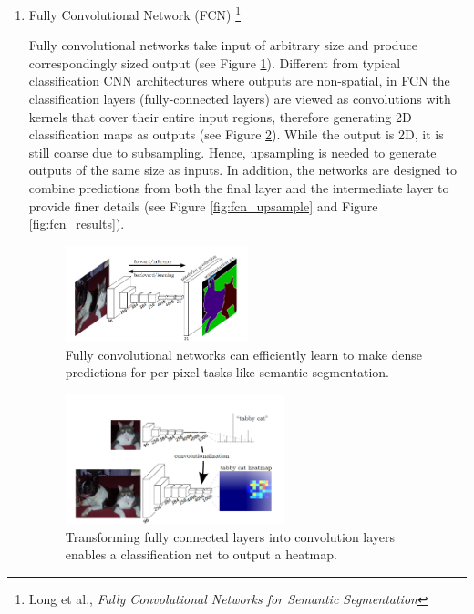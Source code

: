 \documentclass{article}
\begin{document}
\begin{enumerate}

\item Fully Convolutional Network (FCN) \footnote{Long et al., \textit{Fully Convolutional Networks for Semantic Segmentation}}

Fully convolutional networks take input of arbitrary size and produce correspondingly sized output (see Figure \ref{fig:fcn}). Different from typical classification CNN architectures where outputs are non-spatial, in FCN the classification layers (fully-connected layers) are viewed as convolutions with kernels that cover their entire input regions, therefore generating 2D classification maps as outputs (see Figure \ref{fig:fcn_classifier}). While the output is 2D, it is still coarse due to subsampling. Hence, upsampling is needed to generate outputs of the same size as inputs. In addition, the networks are designed to combine predictions from both the final layer and the intermediate layer to provide finer details (see Figure \ref{fig:fcn_upsample} and Figure \ref{fig:fcn_results}).  

\begin{figure}[h]
    \centering
    \includegraphics[width=0.5\textwidth]{21/fcn.png}
    \caption{Fully convolutional networks can efficiently learn to
make dense predictions for per-pixel tasks like semantic segmentation.}
    \label{fig:fcn}
\end{figure}

\begin{figure}[h]
    \centering
    \includegraphics[width=0.6\textwidth]{21/fcn_classifier.png}
    \caption{Transforming fully connected layers into convolution
layers enables a classification net to output a heatmap.}
    \label{fig:fcn_classifier}
\end{figure}


\end{enumerate}
\end{document}
